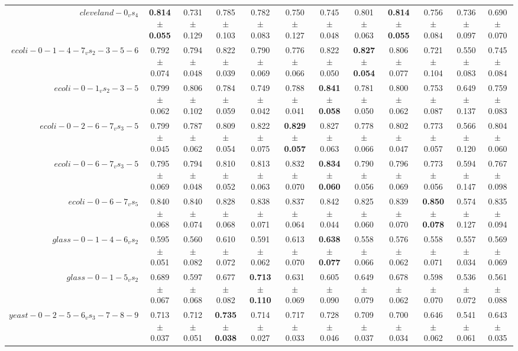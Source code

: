 \begin{table}[!ht]
{\begin{tabular}{r c c c c c c c c c c c}
$cleveland-0_vs_4$ & \textbf{0.814 $\pm$ 0.055} & 0.731 $\pm$ 0.129 & 0.785 $\pm$ 0.103 & 0.782 $\pm$ 0.083 & 0.750 $\pm$ 0.127 & 0.745 $\pm$ 0.048 & 0.801 $\pm$ 0.063 & \textbf{0.814 $\pm$ 0.055} & 0.756 $\pm$ 0.084 & 0.736 $\pm$ 0.097 & 0.690 $\pm$ 0.070 \\
$ecoli-0-1-4-7_vs_2-3-5-6$ & 0.792 $\pm$ 0.074 & 0.794 $\pm$ 0.048 & 0.822 $\pm$ 0.039 & 0.790 $\pm$ 0.069 & 0.776 $\pm$ 0.066 & 0.822 $\pm$ 0.050 & \textbf{0.827 $\pm$ 0.054} & 0.806 $\pm$ 0.077 & 0.721 $\pm$ 0.104 & 0.550 $\pm$ 0.083 & 0.745 $\pm$ 0.084 \\
$ecoli-0-1_vs_2-3-5$ & 0.799 $\pm$ 0.062 & 0.806 $\pm$ 0.102 & 0.784 $\pm$ 0.059 & 0.749 $\pm$ 0.042 & 0.788 $\pm$ 0.041 & \textbf{0.841 $\pm$ 0.058} & 0.781 $\pm$ 0.050 & 0.800 $\pm$ 0.062 & 0.753 $\pm$ 0.087 & 0.649 $\pm$ 0.137 & 0.759 $\pm$ 0.083 \\
$ecoli-0-2-6-7_vs_3-5$ & 0.799 $\pm$ 0.045 & 0.787 $\pm$ 0.062 & 0.809 $\pm$ 0.054 & 0.822 $\pm$ 0.075 & \textbf{0.829 $\pm$ 0.057} & 0.827 $\pm$ 0.063 & 0.778 $\pm$ 0.066 & 0.802 $\pm$ 0.047 & 0.773 $\pm$ 0.057 & 0.566 $\pm$ 0.120 & 0.804 $\pm$ 0.060 \\
$ecoli-0-6-7_vs_3-5$ & 0.795 $\pm$ 0.069 & 0.794 $\pm$ 0.048 & 0.810 $\pm$ 0.052 & 0.813 $\pm$ 0.063 & 0.832 $\pm$ 0.070 & \textbf{0.834 $\pm$ 0.060} & 0.790 $\pm$ 0.056 & 0.796 $\pm$ 0.069 & 0.773 $\pm$ 0.056 & 0.594 $\pm$ 0.147 & 0.767 $\pm$ 0.098 \\
$ecoli-0-6-7_vs_5$ & 0.840 $\pm$ 0.068 & 0.840 $\pm$ 0.074 & 0.828 $\pm$ 0.068 & 0.838 $\pm$ 0.071 & 0.837 $\pm$ 0.064 & 0.842 $\pm$ 0.044 & 0.825 $\pm$ 0.060 & 0.839 $\pm$ 0.070 & \textbf{0.850 $\pm$ 0.078} & 0.574 $\pm$ 0.127 & 0.835 $\pm$ 0.094 \\
$glass-0-1-4-6_vs_2$ & 0.595 $\pm$ 0.051 & 0.560 $\pm$ 0.082 & 0.610 $\pm$ 0.072 & 0.591 $\pm$ 0.062 & 0.613 $\pm$ 0.070 & \textbf{0.638 $\pm$ 0.077} & 0.558 $\pm$ 0.066 & 0.576 $\pm$ 0.062 & 0.558 $\pm$ 0.071 & 0.557 $\pm$ 0.034 & 0.569 $\pm$ 0.069 \\
$glass-0-1-5_vs_2$ & 0.689 $\pm$ 0.067 & 0.597 $\pm$ 0.068 & 0.677 $\pm$ 0.082 & \textbf{0.713 $\pm$ 0.110} & 0.631 $\pm$ 0.069 & 0.605 $\pm$ 0.090 & 0.649 $\pm$ 0.079 & 0.678 $\pm$ 0.062 & 0.598 $\pm$ 0.070 & 0.536 $\pm$ 0.072 & 0.561 $\pm$ 0.088 \\
$yeast-0-2-5-6_vs_3-7-8-9$ & 0.713 $\pm$ 0.037 & 0.712 $\pm$ 0.051 & \textbf{0.735 $\pm$ 0.038} & 0.714 $\pm$ 0.027 & 0.717 $\pm$ 0.033 & 0.728 $\pm$ 0.046 & 0.709 $\pm$ 0.037 & 0.700 $\pm$ 0.034 & 0.646 $\pm$ 0.062 & 0.541 $\pm$ 0.061 & 0.643 $\pm$ 0.035 \\

\end{tabular}}
\end{table}
